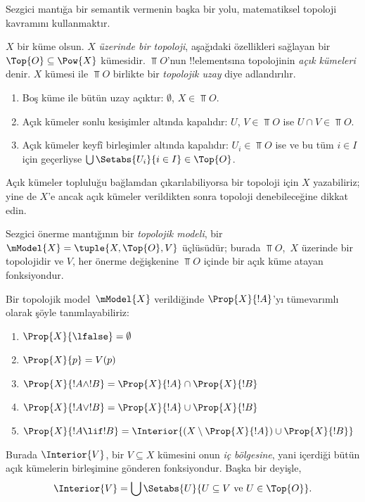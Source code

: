 \documentclass[../../../include/open-logic-section]{subfiles}
\begin{document}


Sezgici mantığa bir semantik vermenin başka bir yolu, matematiksel topoloji
kavramını kullanmaktır.

\begin{defn}
  $X$ bir küme olsun. $X$ \emph{üzerinde bir topoloji}, aşağıdaki özellikleri
  sağlayan bir $\Top{O} \subseteq \Pow{X}$ kümesidir. $\Top{O}$'nun
  !!{element}s{}ına topolojinin \emph{açık kümeleri} denir. $X$ kümesi ile
  $\Top{O}$ birlikte bir \emph{topolojik uzay} diye adlandırılır.
  \begin{enumerate}
  \item Boş küme ile bütün uzay açıktır: $\emptyset$, $X \in \Top{O}$.
  \item Açık kümeler sonlu kesişimler altında kapalıdır: $U$, $V \in \Top{O}$
    ise $U \cap V \in \Top{O}$.
  \item Açık kümeler keyfî birleşimler altında kapalıdır: $U_i \in \Top{O}$
    ise ve bu tüm $i \in I$ için geçerliyse $\bigcup \Setabs{U_i}{i \in I}
    \in \Top{O}$.
  \end{enumerate}
\end{defn}

Açık kümeler topluluğu bağlamdan çıkarılabiliyorsa bir topoloji için $X$
yazabiliriz; yine de $X$'e ancak açık kümeler verildikten sonra topoloji
denebileceğine dikkat edin.

\begin{defn}
  Sezgici önerme mantığının bir \emph{topolojik modeli}, bir $\mModel{X} =
  \tuple{X, \Top{O}, V}$ üçlüsüdür; burada $\Top{O}$,~$X$ üzerinde bir
  topolojidir ve $V$, her önerme değişkenine $\Top{O}$ içinde bir açık küme
  atayan fonksiyondur.

  Bir topolojik model~$\mModel{X}$ verildiğinde $\Prop{X}{!A}$'yı tümevarımlı
  olarak şöyle tanımlayabiliriz:
  \begin{enumerate}
  \item $\Prop{X}{\lfalse} = \emptyset$
  \item $\Prop{X}{p} = V(p)$
  \item $\Prop{X}{!A \land !B} = \Prop{X}{!A} \cap \Prop{X}{!B}$
  \item $\Prop{X}{!A \lor !B} = \Prop{X}{!A} \cup \Prop{X}{!B}$
  \item $\Prop{X}{!A \lif !B} = \Interior{(X \setminus \Prop{X}{!A}) \cup
    \Prop{X}{!B}}$
  \end{enumerate}
  Burada $\Interior{V}$, bir $V \subseteq X$ kümesini onun \emph{iç
  bölgesine}, yani içerdiği bütün açık kümelerin birleşimine gönderen
  fonksiyondur. Başka bir deyişle,
  \[
  \Interior{V} = \bigcup \Setabs{U}{U \subseteq V \text{ ve } U \in \Top{O}}.
  \]
\end{defn}
\end{document}
